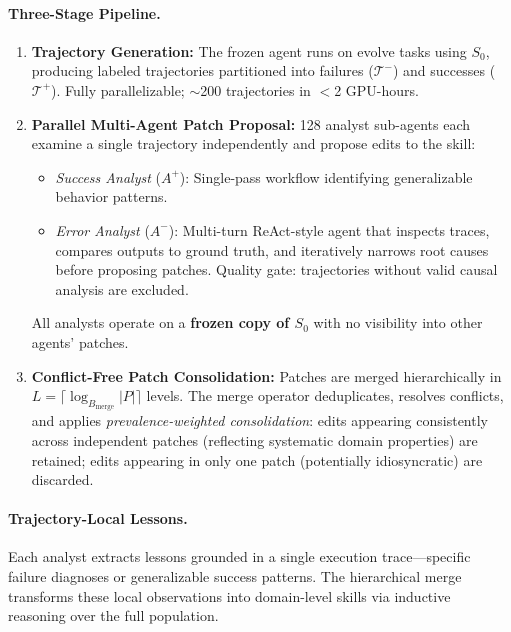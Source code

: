 \documentclass[11pt]{article}
\begin{document}
\paragraph{Three-Stage Pipeline.}

\begin{enumerate}
    \item \textbf{Trajectory Generation:} The frozen agent runs on evolve tasks using $S_0$, producing labeled trajectories partitioned into failures ($\mathcal{T}^-$) and successes ($\mathcal{T}^+$). Fully parallelizable; $\sim$200 trajectories in $<$2 GPU-hours.

    \item \textbf{Parallel Multi-Agent Patch Proposal:} 128 analyst sub-agents each examine a single trajectory independently and propose edits to the skill:
    \begin{itemize}
        \item \textit{Success Analyst} ($A^+$): Single-pass workflow identifying generalizable behavior patterns.
        \item \textit{Error Analyst} ($A^-$): Multi-turn ReAct-style agent that inspects traces, compares outputs to ground truth, and iteratively narrows root causes before proposing patches. Quality gate: trajectories without valid causal analysis are excluded.
    \end{itemize}
    All analysts operate on a \textbf{frozen copy of $S_0$} with no visibility into other agents' patches.

    \item \textbf{Conflict-Free Patch Consolidation:} Patches are merged hierarchically in $L = \lceil \log_{B_{\mathrm{merge}}} |P| \rceil$ levels. The merge operator deduplicates, resolves conflicts, and applies \textit{prevalence-weighted consolidation}: edits appearing consistently across independent patches (reflecting systematic domain properties) are retained; edits appearing in only one patch (potentially idiosyncratic) are discarded.
\end{enumerate}

\paragraph{Trajectory-Local Lessons.}
Each analyst extracts lessons grounded in a single execution trace---specific failure diagnoses or generalizable success patterns. The hierarchical merge transforms these local observations into domain-level skills via inductive reasoning over the full population.
\end{document}
